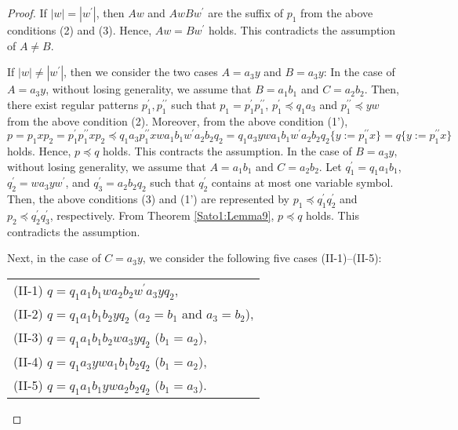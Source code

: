 \begin{proof}
If $|w|=|w^{\prime}|$, then $Aw$ and $AwBw^{\prime}$ are the suffix of $p_{1}$ from the above conditions (2) and (3).
Hence, $Aw=Bw^{\prime}$ holds.
This contradicts the assumption of $A \ne B$.

If $|w| \ne |w^{\prime}|$, then we consider the two cases $A=a_{3}y$ and $B=a_{3}y$:
In the case of $A=a_{3}y$, without losing generality, we assume that $B=a_{1}b_{1}$ and $C=a_{2}b_{2}$. 
Then, there exist regular patterns $p_{1}^{\prime}, p_{1}^{\prime\prime}$ such that $p_{1}=p_{1}^{\prime}p_{1}^{\prime\prime}$, $p_{1}^{\prime} \preceq q_{1}a_{3}$ and $p_{1}^{\prime\prime} \preceq yw$ from the above condition (2).
Moreover, from the above condition (1'), $p=p_{1}xp_{2}=p_{1}^{\prime}p_{1}^{\prime\prime}xp_{2}\preceq q_{1}a_{3}p_{1}^{\prime\prime}xwa_{1}b_{1}w^{\prime}a_{2}b_{2}q_{2}=
q_{1}a_{3}ywa_{1}b_{1}w^{\prime}a_{2}b_{2}q_{2}\{ y := p_{1}^{\prime\prime}x \}=q \{ y := p_{1}^{\prime\prime}x \}$ holds.
Hence, $p \preceq q$ holds.
This contracts the assumption.
In the case of $B=a_{3}y$, without losing generality, we assume that $A=a_{1}b_{1}$ and $C=a_{2}b_{2}$.
Let $q_{1}^{\prime}=q_{1}a_{1}b_{1}$, $q_{2}^{\prime}=wa_{3}yw^{\prime}$, and $q_{3}^{\prime}=a_{2}b_{2}q_{2}$ such that $q_{2}^{\prime}$ contains at most one variable symbol.
Then, the above conditions (3) and (1') are represented by $p_{1} \preceq q_{1}^{\prime}q_{2}^{\prime}$ and $p_{2} \preceq q_{2}^{\prime}q_{3}^{\prime}$, respectively.
From Theorem \ref{Sato1:Lemma9}, $p \preceq q$ holds.
This contradicts the assumption.

    
Next, in the case of $C=a_{3}y$, we consider the following five cases (II-1)--(II-5):

\begin{tabular}{l}
(II-1) $q=q_{1}a_{1}b_{1}wa_{2}b_{2}w^{\prime}a_{3}yq_{2}$,\\
(II-2) $q=q_{1}a_{1}b_{1}b_{2}yq_{2}$ ($a_{2}=b_{1}$ and $a_{3}=b_{2}$),\\
(II-3) $q=q_{1}a_{1}b_{1}b_{2}wa_{3}yq_{2}$ ($b_{1}=a_{2}$),\\
(II-4) $q=q_{1}a_{3}ywa_{1}b_{1}b_{2}q_{2}$ ($b_{1}=a_{2}$),\\
(II-5) $q=q_{1}a_{1}b_{1}ywa_{2}b_{2}q_{2}$ ($b_{1}=a_{3}$).
\end{tabular}


\end{proof}
